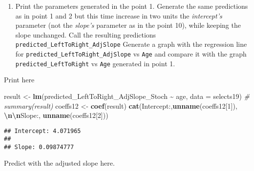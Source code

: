 \documentclass[
]{book}
\newenvironment{Shaded}{\begin{snugshade}}{\end{snugshade}}
\newcommand{\AttributeTok}[1]{\textcolor[rgb]{0.13,0.29,0.53}{#1}}
\newcommand{\CommentTok}[1]{\textcolor[rgb]{0.56,0.35,0.01}{\textit{#1}}}
\newcommand{\DecValTok}[1]{\textcolor[rgb]{0.00,0.00,0.81}{#1}}
\newcommand{\FunctionTok}[1]{\textcolor[rgb]{0.13,0.29,0.53}{\textbf{#1}}}
\newcommand{\NormalTok}[1]{#1}
\newcommand{\OtherTok}[1]{\textcolor[rgb]{0.56,0.35,0.01}{#1}}
\newcommand{\SpecialCharTok}[1]{\textcolor[rgb]{0.81,0.36,0.00}{\textbf{#1}}}
\newcommand{\StringTok}[1]{\textcolor[rgb]{0.31,0.60,0.02}{#1}}
\providecommand{\tightlist}{%
  \setlength{\itemsep}{0pt}\setlength{\parskip}{0pt}}
\begin{document}
\begin{enumerate}
\def\labelenumi{\arabic{enumi}.}
\setcounter{enumi}{11}
\tightlist
\item
  Print the parameters generated in the point 1. Generate the same predictions as in point 1 and 2 but this time increase in two units the \emph{intercept's} parameter (not the \emph{slope's} parameter as in the point 10), while keeping the slope unchanged. Call the resulting predictions \texttt{predicted\_LeftToRight\_AdjSlope} Generate a graph with the regression line for \texttt{predicted\_LeftToRight\_AdjSlope} vs \texttt{Age} and compare it with the graph \texttt{predicted\_LeftToRight} vs \texttt{Age} generated in point 1.
\end{enumerate}

Print here

\begin{Shaded}
\begin{Highlighting}[]
\NormalTok{result }\OtherTok{\textless{}{-}} \FunctionTok{lm}\NormalTok{(predicted\_LeftToRight\_AdjSlope\_Stoch }\SpecialCharTok{\textasciitilde{}}\NormalTok{ age, }\AttributeTok{data =}\NormalTok{ selects19)}
\CommentTok{\# summary(result)}
\NormalTok{coeffs12 }\OtherTok{\textless{}{-}} \FunctionTok{coef}\NormalTok{(result)}
\FunctionTok{cat}\NormalTok{(}\StringTok{\textquotesingle{}Intercept:\textquotesingle{}}\NormalTok{,}\FunctionTok{unname}\NormalTok{(coeffs12[}\DecValTok{1}\NormalTok{]), }\StringTok{\textquotesingle{}}\SpecialCharTok{\textbackslash{}n\textbackslash{}n}\StringTok{Slope:\textquotesingle{}}\NormalTok{, }\FunctionTok{unname}\NormalTok{(coeffs12[}\DecValTok{2}\NormalTok{]))}
\end{Highlighting}
\end{Shaded}

\begin{verbatim}
## Intercept: 4.071965 
## 
## Slope: 0.09874777
\end{verbatim}

Predict with the adjusted slope here.

\begin{Shaded}
\end{Shaded}
\end{document}
